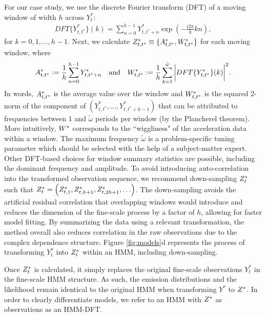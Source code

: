 For our case study, we use the discrete Fourier transform (DFT) of a moving window of width $h$ across $Y^*_t$:
%
\begin{align*}
    DFT\{Y^*_{t,t^*}\}(k) = \sum_{n=0}^{h-1} Y^*_{t,t^*+n}\exp\left(-\frac{i 2\pi}{h} kn \right),
\end{align*}
%
for $k = 0, 1, \ldots, h-1$. Next, we calculate $Z^*_{t,t^*} \equiv \{A^*_{t,t^*},W^*_{t,t^*}\}$ for each moving window, where
%
\begin{equation}
    \label{eqn:z}
    \Zone_{t,t^*} := \frac{1}{h}\sum_{n=0}^{h-1}Y^*_{t,t^*+n} \quad \text{and} \quad \Ztwo_{t,t^*} := \frac{1}{h}\sum_{k=1}^{\tilde{\omega}}\bigg|DFT\{Y^*_{t,t^*}\}(k)\bigg|^2.
\end{equation}
%
In words, $A^*_{t,t^*}$ is the average value over the window and $W^*_{t,t^*}$ is the squared 2-norm of the component of $\left(Y^*_{t,t^*}, \ldots, Y^*_{t,t^*+h-1}\right)$ that can be attributed to frequencies between $1$ and $\tilde{\omega}$ periods per window (by the Plancherel theorem). More intuitively, $W^*$ corresponds to the ``wiggliness" of the acceleration data within a window. The maximum frequency $\tilde{\omega}$ is a problem-specific tuning parameter which should be selected with the help of a subject-matter expert. Other DFT-based choices for window summary statistics are possible, including the dominant frequency and amplitude. To avoid introducing auto-correlation into the transformed observation sequence, we recommend down-sampling $Z^*_t$ such that $Z^*_t = \left(Z^*_{t,1},Z^*_{t,h+1},Z^*_{t,2h+1},\ldots\right)$. The down-sampling avoids the artificial residual correlation that overlapping windows would introduce and reduces the dimension of the fine-scale process by a factor of $h$, allowing for faster model fitting. By summarizing the data using a relevant transformation, the method overall also reduces correlation in the raw observations due to the complex dependence structure. Figure \ref{fig:models}d represents the process of transforming $Y^*_{t}$ into $Z^*_{t}$ within an HMM, including down-sampling.

Once $Z^*_t$ is calculated, it simply replaces the original fine-scale observations $Y^*_t$ in the fine-scale HMM structure. As such, the emission distributions and the likelihood remain identical to the original HMM when transforming $Y^*$ to $Z^*$. In order to clearly differentiate models, we refer to an HMM with $Z^*$ as observations as an HMM-DFT.


